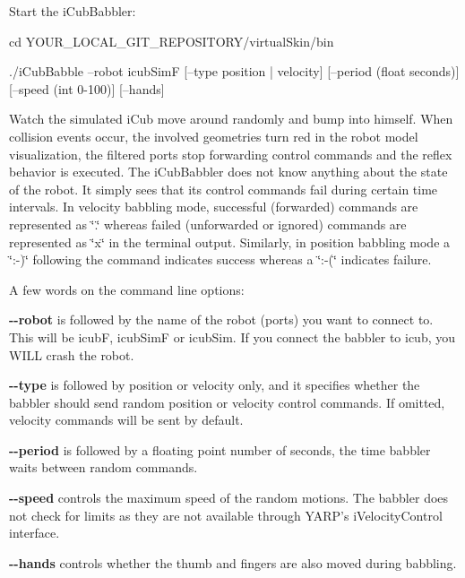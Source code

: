 Start the iCubBabbler: \begin{DoxyVerb}cd YOUR_LOCAL_GIT_REPOSITORY/virtualSkin/bin \end{DoxyVerb}
 \begin{DoxyVerb}./iCubBabble --robot icubSimF [--type position | velocity] [--period (float seconds)] [--speed (int 0-100)] [--hands] \end{DoxyVerb}
 Watch the simulated iCub move around randomly and bump into himself. When collision events occur, the involved geometries turn red in the robot model visualization, the filtered ports stop forwarding control commands and the reflex behavior is executed. The iCubBabbler does not know anything about the state of the robot. It simply sees that its control commands fail during certain time intervals. In velocity babbling mode, successful (forwarded) commands are represented as \char`\"{}.\char`\"{} whereas failed (unforwarded or ignored) commands are represented as \char`\"{}x\char`\"{} in the terminal output. Similarly, in position babbling mode a \char`\"{}:-\/)\char`\"{} following the command indicates success whereas a \char`\"{}:-\/(\char`\"{} indicates failure.

A few words on the command line options:
\begin{DoxyItemize}
\item {\bfseries -\/-\/robot} is followed by the name of the robot (ports) you want to connect to. This will be {\ttfamily icubF}, {\ttfamily icubSimF} or {\ttfamily icubSim}. If you connect the babbler to {\ttfamily icub}, you WILL crash the robot.
\item {\bfseries -\/-\/type} is followed by {\ttfamily position} or {\ttfamily velocity} only, and it specifies whether the babbler should send random position or velocity control commands. If omitted, velocity commands will be sent by default.
\item {\bfseries -\/-\/period} is followed by a floating point number of seconds, the time babbler waits between random commands.
\item {\bfseries -\/-\/speed} controls the maximum speed of the random motions. The babbler does not check for limits as they are not available through YARP's iVelocityControl interface.
\item {\bfseries -\/-\/hands} controls whether the thumb and fingers are also moved during babbling.
\end{DoxyItemize}

